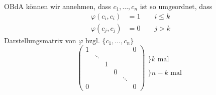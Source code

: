 \documentclass[titlepage,12pt,a4paper,ngerman]{report}
\newcommand{\tx}[1]{\textrm{#1}}
\begin{document}
OBdA können wir annehmen, dass $ c_1,\dots,c_n $ ist so umgeordnet, dass
\begin{align*}
\varphi(c_i,c_i) &= 1  \qquad i \le k\\
\varphi(c_j,c_j) &= 0  \qquad j > k
\end{align*}
Darstellungsmatrix von $ \varphi $ bzgl. $ \{c_1,\dots , c_n\} $
$$ \begin{pmatrix}
1 & & & & & 0\\
& \ddots\\
& & 1\\
& & & 0\\
& & & & \ddots\\
0 & & & & & 0
\end{pmatrix} \begin{array}{l}
\\
\Bigg\} k \tx{ mal}\\
\\
\bigg\} n-k \tx{ mal}\\
\\
\end{array}$$
\end{document}
